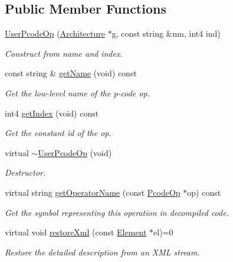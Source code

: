 \subsection*{Public Member Functions}
\begin{DoxyCompactItemize}
\item 
\mbox{\hyperlink{class_user_pcode_op_a291d0e1a6d9c824de639859ce19554c1}{User\+Pcode\+Op}} (\mbox{\hyperlink{class_architecture}{Architecture}} $\ast$g, const string \&nm, int4 ind)
\begin{DoxyCompactList}\small\item\em Construct from name and index. \end{DoxyCompactList}\item 
const string \& \mbox{\hyperlink{class_user_pcode_op_a580a157f5fa5a71f323f5fd59627d5c9}{get\+Name}} (void) const
\begin{DoxyCompactList}\small\item\em Get the low-\/level name of the p-\/code op. \end{DoxyCompactList}\item 
int4 \mbox{\hyperlink{class_user_pcode_op_afdeaf916b1559b26a65abb2b2d649870}{get\+Index}} (void) const
\begin{DoxyCompactList}\small\item\em Get the constant id of the op. \end{DoxyCompactList}\item 
virtual \mbox{\hyperlink{class_user_pcode_op_a08600cf33539413bf36106e945d8a470}{$\sim$\+User\+Pcode\+Op}} (void)
\begin{DoxyCompactList}\small\item\em Destructor. \end{DoxyCompactList}\item 
virtual string \mbox{\hyperlink{class_user_pcode_op_a7529472e93f9077d5bfdb9cc1142bfbb}{get\+Operator\+Name}} (const \mbox{\hyperlink{class_pcode_op}{Pcode\+Op}} $\ast$op) const
\begin{DoxyCompactList}\small\item\em Get the symbol representing this operation in decompiled code. \end{DoxyCompactList}\item 
virtual void \mbox{\hyperlink{class_user_pcode_op_a2a7b7c637369bc4fba4604cd83a937af}{restore\+Xml}} (const \mbox{\hyperlink{class_element}{Element}} $\ast$el)=0
\begin{DoxyCompactList}\small\item\em Restore the detailed description from an X\+ML stream. \end{DoxyCompactList}\end{DoxyCompactItemize}
